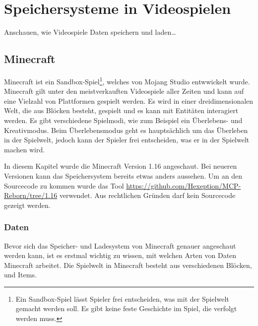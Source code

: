 \chapter{Speichersysteme in Videospielen}\label{ch:videospiele}
Anschauen, wie Videospiele Daten speichern und laden\dots


\section{Minecraft}
Minecraft ist ein Sandbox-Spiel\footnote{Ein Sandbox-Spiel lässt Spieler frei entscheiden, was mit der Spielwelt gemacht werden soll. Es gibt keine feste Geschichte im Spiel, die verfolgt werden muss.\cite{ocio2009multi}}, welches von Mojang Studio entwwickelt wurde. Minecraft gilt unter den meistverkauften Videospiele aller Zeiten und kann auf eine Vielzahl von Plattformen gespielt werden.\cite{ignBestSellingVideo} Es wird in einer dreidimensionalen Welt, die aus Blöcken besteht, gespielt und es kann mit Entitäten interagiert werden. Es gibt verschiedene Spielmodi, wie zum Beispiel ein Überlebens- und Kreativmodus. Beim Überlebensmodus geht es hauptsächlich um das Überleben in der Spielwelt, jedoch kann der Spieler frei entscheiden, was er in der Spielwelt machen wird.\cite{minecraftWikiHome}


In diesem Kapitel wurde die Minecraft Version 1.16 angeschaut. 
Bei neueren Versionen kann das Speichersystem bereits etwas anders aussehen. Um an den Sourcecode zu kommen wurde das Tool 
\url{https://github.com/Hexeption/MCP-Reborn/tree/1.16} verwendet. Aus rechtlichen Gründen darf kein
Sourcecode gezeigt werden.

\subsection{Daten}
Bevor sich das Speicher- und Ladesystem von Minecraft genauer angeschaut werden kann, ist es erstmal wichtig zu wissen, mit welchen Arten von Daten Minecraft arbeitet. Die Spielwelt in Minecraft besteht aus verschiedenen Blöcken,  und Items. 

